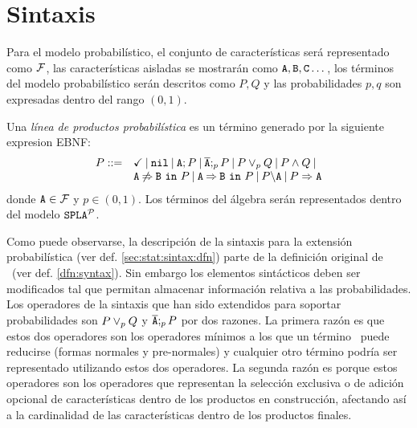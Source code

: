 
\section{Sintaxis}
\label{sec:stat:sintax}

Para el modelo probabilístico, el conjunto de características será representado como $\calF$,
las características aisladas se mostrarán como $\feature{A}, \feature{B}, \feature{C}\dots$,
los términos del modelo probabilístico serán descritos como $P,Q$ y
las probabilidades $p,q$ son expresadas dentro del rango $(0,1)$.

\bdfn
\label{sec:stat:sintax:dfn}
Una \emph{línea de productos probabilística} es un término generado por la siguiente
expresion EBNF:
$$
\begin{array}{ll}
P::=& \checkmark \barra \nil \barra \feature{A};P \barra
\ofeature{A};_{p} P \barra P \choice_{p} Q \barra P \paral Q \barra
\\ 
& \exclude{A}{B}{P}\barra  \require{A}{B}{P}\barra  \forbid{A}{P}\barra  \mandatory{A}{P}\\ 
\end{array}     
$$
\noindent 
donde $\feature{A} \in \calF$ y $p\in(0,1)$. Los términos del álgebra
serán representados dentro del modelo $\fodaPAp$.
\edfn

Como puede observarse, la descripción de la sintaxis
para la extensión probabilística (ver def. \ref{sec:stat:sintax:dfn})
parte de la definición original de \fodaPA\ (ver def. \ref{dfn:syntax}).
Sin embargo los elementos sintácticos deben ser modificados tal que
permitan almacenar información relativa a las probabilidades.
%
Los operadores de la sintaxis que han sido extendidos para soportar
probabilidades son $P \choice_{p} Q$ y $\ofeature{A};_{p} P$
por dos razones.
%
La primera razón es que estos dos operadores son los operadores mínimos
a los que un término \fodaPA\ puede reducirse (formas normales y pre-normales) y
cualquier otro término podría ser representado utilizando estos dos operadores. 
La segunda razón es porque estos operadores son los operadores que representan
la selección exclusiva o de adición opcional de características dentro de
los productos en construcción, afectando
así a la cardinalidad de las características dentro de los productos finales.




